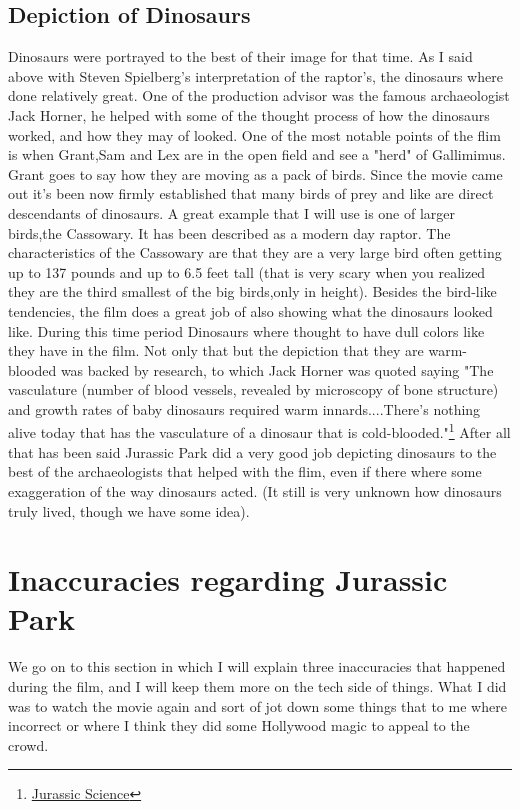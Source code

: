 \documentclass[12ptletterpaper]{paper}
\newcommand\tab[1][1cm]{\hspace*{#1}}
\begin{document}
\begin{flushleft}
		\subsection{Depiction of Dinosaurs}
		\tab Dinosaurs were portrayed to the best of their image for that time. As I said above with Steven Spielberg's interpretation of the raptor's, the dinosaurs where done relatively great. One of the production advisor was the famous archaeologist Jack Horner, he helped with some of the thought process of how the dinosaurs worked, and how they may of looked. One of the most notable points of the flim is when Grant,Sam and Lex are in the open field and see a "herd" of Gallimimus. Grant goes to say how they are moving as a pack of birds. Since the movie came out it's been now firmly established that many birds of prey and like are direct descendants of dinosaurs. A great example that I will use is one of larger birds,the Cassowary. It has been described as a modern day raptor. The characteristics of the Cassowary are that they are a very large bird often getting up to  137 pounds and up to 6.5 feet tall (that is very scary when you realized they are the third smallest of the big birds,only in height). 
		\tab Besides the bird-like tendencies, the film does a great job of also showing what the dinosaurs looked like. During this time period Dinosaurs where thought to have dull colors like they have in the film. Not only that but the depiction that they are warm-blooded was backed by research, to which Jack Horner was quoted saying "The vasculature (number of blood vessels, revealed by microscopy of bone structure) and growth rates of baby dinosaurs required warm innards....There's nothing alive today that has the vasculature of a dinosaur that is cold-blooded."\footnote[8]{\hyperlink{Jurassic Science}{Jurassic Science}}
		\tab After all that has been said Jurassic Park did a very good job depicting dinosaurs to the best of the archaeologists that helped with the flim, even if there where some exaggeration of the way dinosaurs acted. (It still is very unknown how dinosaurs truly lived, though we have some idea).
		
		\section{Inaccuracies regarding Jurassic Park}
		\tab We go on to this section in which I will explain three inaccuracies that happened during the film, and I will keep them more on the tech side of things.
		 What I did was to watch the movie again and sort of jot down some things that to me where incorrect or where I think they did some Hollywood magic to appeal to the crowd.
		 

\end{flushleft}
\end{document}
